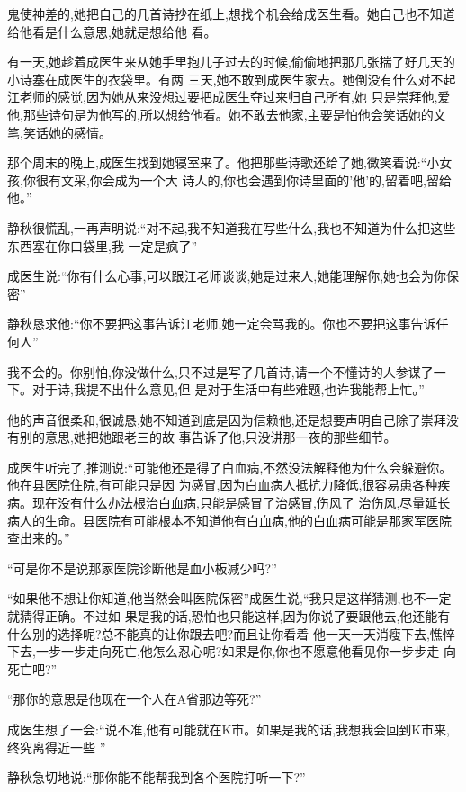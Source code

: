 ﻿\documentclass[12pt]{article}
\begin{document}
鬼使神差的,她把自己的几首诗抄在纸上,想找个机会给成医生看。她自己也不知道给他看是什么意思,她就是想给他
看。

有一天,她趁着成医生来从她手里抱儿子过去的时候,偷偷地把那几张揣了好几天的小诗塞在成医生的衣袋里。有两
三天,她不敢到成医生家去。她倒没有什么对不起江老师的感觉,因为她从来没想过要把成医生夺过来归自己所有,她
只是崇拜他,爱他,那些诗句是为他写的,所以想给他看。她不敢去他家,主要是怕他会笑话她的文笔,笑话她的感情。

那个周末的晚上,成医生找到她寝室来了。他把那些诗歌还给了她,微笑着说:``小女孩,你很有文采,你会成为一个大
诗人的,你也会遇到你诗里面的'他'的,留着吧,留给他。''

静秋很慌乱,一再声明说:``对不起,我不知道我在写些什么,我也不知道为什么把这些东西塞在你口袋里,我\myrule 
一定是疯了\myrule ''

成医生说:``你\myrule 有什么心事,可以跟江老师谈谈,她是过来人,她能理解你,她也会为你保密\myrule ''

静秋恳求他:``你不要把这事告诉江老师,她一定会骂我的。你也不要把这事告诉任何人\myrule ''
 

我不会的。你别怕,你没做什么,只不过是写了几首诗,请一个不懂诗的人参谋了一下。对于诗,我提不出什么意见,但
是对于生活中有些难题,也许我能帮上忙。''

他的声音很柔和,很诚恳,她不知道到底是因为信赖他,还是想要声明自己除了崇拜没有别的意思,她把她跟老三的故
事告诉了他,只没讲那一夜的那些细节。

成医生听完了,推测说:``可能他还是得了白血病,不然没法解释他为什么会躲避你。他在县医院住院,有可能只是因
为感冒,因为白血病人抵抗力降低,很容易患各种疾病。现在没有什么办法根治白血病,只能是感冒了治感冒,伤风了
治伤风,尽量延长病人的生命。县医院有可能根本不知道他有白血病,他的白血病可能是那家军医院查出来的。''

``可是你不是说\myrule 那家医院诊断他是\myrule 血小板减少吗?''

``如果他不想让你知道,他当然会叫医院保密\myrule ''成医生说,``我只是这样猜测,也不一定就猜得正确。不过如
果是我的话,恐怕也只能这样,因为你说了要跟他去,他还能有什么别的选择呢?总不能真的让你跟去吧?而且让你看着
他一天一天消瘦下去,憔悴下去,一步一步走向\myrule 死亡,他怎么忍心呢?如果是你,你也不愿意他看见你一步步走
向\myrule 死亡吧?''

``那你的意思是他\myrule 现在一个人在A省那边\myrule 等\myrule 死?''

成医生想了一会:``说不准,他有可能就在K市。如果是我的话,我想我会回到K市来,终究\myrule 离得近一些
\myrule ''

静秋急切地说:``那\myrule 你能不能帮我到各个医院\myrule 打听一下?''
\end{document}
